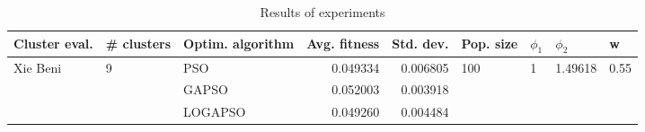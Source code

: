 \begin{table}
\centering
\caption{Results of experiments}
\begin{tabular}{lllrrllll}
\toprule
            Cluster eval. &        \# clusters & Optim. algorithm &  Avg. fitness &  Std. dev. &            Pop. size &         $\phi_{1}$ &               $\phi_{2}$ &                     w \\
\midrule
\multirow{3}{*}{Xie Beni} & \multirow{3}{*}{9} &              PSO &      0.049334 &   0.006805 & \multirow{3}{*}{100} & \multirow{3}{*}{1} & \multirow{3}{*}{1.49618} & \multirow{3}{*}{0.55} \\
                          &                    &            GAPSO &      0.052003 &   0.003918 &                      &                    &                          &                       \\
                          &                    &          LOGAPSO &      0.049260 &   0.004484 &                      &                    &                          &                       \\
\bottomrule
\end{tabular}
\end{table}
